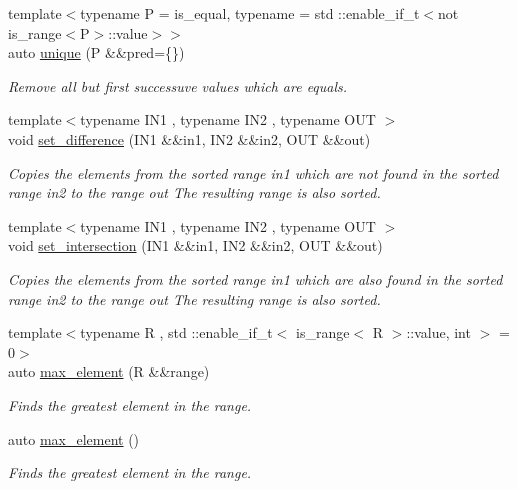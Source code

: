 \begin{DoxyCompactItemize}
{\footnotesize template$<$typename P  = is\+\_\+equal, typename  = std \+::enable\+\_\+if\+\_\+t$<$not is\+\_\+range$<$\+P$>$\+::value$>$$>$ }\\auto \mbox{\hyperlink{namespacerah_aafbbb6f9bd014675985d33d93221acca}{unique}} (P \&\&pred=\{\})
\begin{DoxyCompactList}\small\item\em Remove all but first successuve values which are equals. \end{DoxyCompactList}\item 
{\footnotesize template$<$typename I\+N1 , typename I\+N2 , typename O\+UT $>$ }\\void \mbox{\hyperlink{namespacerah_aca8dbcc943f7c503acea5f58f231a5af}{set\+\_\+difference}} (I\+N1 \&\&in1, I\+N2 \&\&in2, O\+UT \&\&out)
\begin{DoxyCompactList}\small\item\em Copies the elements from the sorted range in1 which are not found in the sorted range in2 to the range out The resulting range is also sorted. \end{DoxyCompactList}\item 
{\footnotesize template$<$typename I\+N1 , typename I\+N2 , typename O\+UT $>$ }\\void \mbox{\hyperlink{namespacerah_a41cb09a0285e2a6814b8aa99f90ba987}{set\+\_\+intersection}} (I\+N1 \&\&in1, I\+N2 \&\&in2, O\+UT \&\&out)
\begin{DoxyCompactList}\small\item\em Copies the elements from the sorted range in1 which are also found in the sorted range in2 to the range out The resulting range is also sorted. \end{DoxyCompactList}\item 
{\footnotesize template$<$typename R , std \+::enable\+\_\+if\+\_\+t$<$ is\+\_\+range$<$ R $>$\+::value, int $>$  = 0$>$ }\\auto \mbox{\hyperlink{namespacerah_a84983065bc08e1416b730260a0ab033c}{max\+\_\+element}} (R \&\&range)
\begin{DoxyCompactList}\small\item\em Finds the greatest element in the range. \end{DoxyCompactList}\item 
auto \mbox{\hyperlink{namespacerah_a6553b7209f85e70a671b3c3c6153d255}{max\+\_\+element}} ()
\begin{DoxyCompactList}\small\item\em Finds the greatest element in the range. \end{DoxyCompactList}\item 

\end{DoxyCompactItemize}
